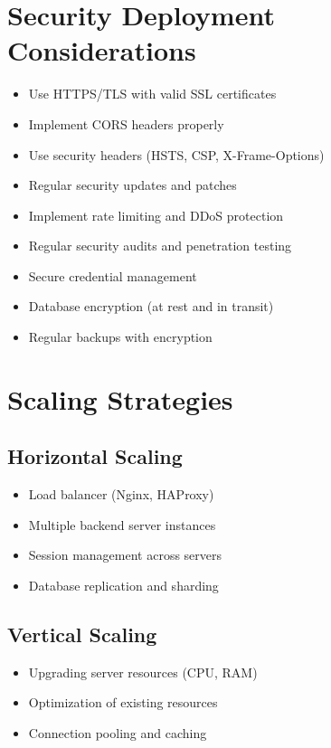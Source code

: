 \section{Security Deployment Considerations}

\begin{itemize}
    \item Use HTTPS/TLS with valid SSL certificates
    \item Implement CORS headers properly
    \item Use security headers (HSTS, CSP, X-Frame-Options)
    \item Regular security updates and patches
    \item Implement rate limiting and DDoS protection
    \item Regular security audits and penetration testing
    \item Secure credential management
    \item Database encryption (at rest and in transit)
    \item Regular backups with encryption
\end{itemize}

\section{Scaling Strategies}

\subsection{Horizontal Scaling}

\begin{itemize}
    \item Load balancer (Nginx, HAProxy)
    \item Multiple backend server instances
    \item Session management across servers
    \item Database replication and sharding
\end{itemize}

\subsection{Vertical Scaling}

\begin{itemize}
    \item Upgrading server resources (CPU, RAM)
    \item Optimization of existing resources
    \item Connection pooling and caching
\end{itemize}

